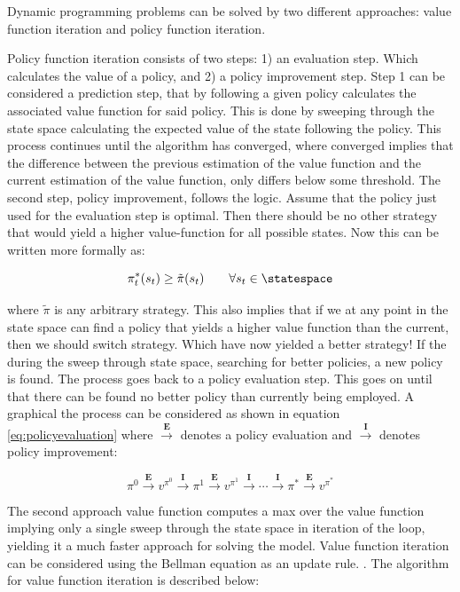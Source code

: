 Dynamic programming problems can be solved by two different approaches: value function iteration and policy function iteration.

Policy function iteration consists of two steps: 1) an evaluation step. Which calculates the value of a policy, and 2) a policy improvement step.
Step 1 can be considered a prediction step, that by following a given policy calculates the associated value function for said policy. This is done by sweeping through the state space calculating the expected value of the state following the policy. This process continues until the algorithm has converged, where converged implies that the difference between the previous estimation of the value function and the current estimation of the value function, only differs below some threshold. The second step, policy improvement, follows the logic. Assume that the policy just used for the evaluation step is optimal. Then there should be no other strategy that would yield a higher value-function for all possible states. Now this can be written more formally as:

\begin{equation}
    \pi^*_t (s_t) \geq \tilde{\pi}(s_t)\qquad \forall s_t \in \statespace
\end{equation}

where $\tilde{\pi}$ is any arbitrary strategy. This also implies that if we at any point in the state space can find a policy that yields a higher value function than the current, then we should switch strategy. Which have now yielded a better strategy! If the during the sweep through state space, searching for better policies, a new policy is found. The process goes back to a policy evaluation step. This goes on until that there can be found no better policy than currently being employed. A graphical the process can be considered as shown in equation \eqref{eq:policyevaluation} where $\overset{\textbf{E}}{\longrightarrow}$ denotes a policy evaluation and $\overset{\textbf{I}}{\longrightarrow}$ denotes policy improvement:

\begin{equation}
    \label{eq:policyevaluation}
    \pi^0 \overset{\textbf{E}}{\longrightarrow}
    v^{\pi^0} \overset{\textbf{I}}{\longrightarrow} \pi^1 \overset{\textbf{E}}{\longrightarrow} v^{\pi^1} \overset{\textbf{I}}{\longrightarrow} \cdots \overset{\textbf{I}}{\longrightarrow} \pi^* \overset{\textbf{E}}{\longrightarrow} v^{\pi^*}
\end{equation}

The second approach value function computes a max over the value function implying only a single sweep through the state space in iteration of the loop, yielding it a much faster approach for solving the model. Value function iteration can be considered using the Bellman equation as an update rule. \parencite{sutton_reinforcement_2018}. The algorithm for value function iteration is described below:

